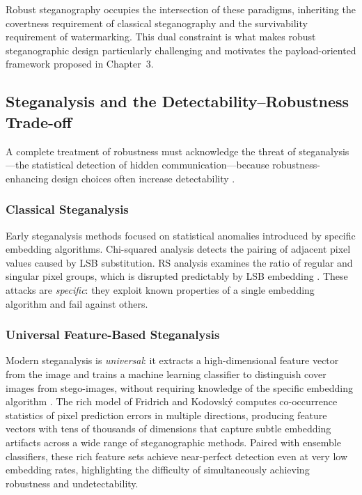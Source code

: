 \documentclass[12pt,a4paper,oneside]{report}
\begin{document}
	Robust steganography occupies the intersection of these paradigms, inheriting the
	covertness requirement of classical steganography and the survivability requirement of
	watermarking.
	This dual constraint is what makes robust steganographic design particularly challenging
	and motivates the payload-oriented framework proposed in Chapter~3.
	
	\subsection{Steganalysis and the Detectability–Robustness Trade-off}
	\label{subsec:steganalysis}
	
	A complete treatment of robustness must acknowledge the threat of steganalysis—the
	statistical detection of hidden communication—because robustness-enhancing design choices
	often increase detectability \cite{Fridrich2012, petitcolas1999information}.
	
	\subsubsection{Classical Steganalysis}
	
	Early steganalysis methods focused on statistical anomalies introduced by specific
	embedding algorithms.
	Chi-squared analysis \cite{provos2003hide} detects the pairing of adjacent pixel values
	caused by LSB substitution.
	RS analysis examines the ratio of regular and singular pixel groups, which is disrupted
	predictably by LSB embedding \cite{provos2003hide}.
	These attacks are \emph{specific}: they exploit known properties of a single embedding
	algorithm and fail against others.
	
	\subsubsection{Universal Feature-Based Steganalysis}
	
	Modern steganalysis is \emph{universal}: it extracts a high-dimensional feature vector
	from the image and trains a machine learning classifier to distinguish cover images from
	stego-images, without requiring knowledge of the specific embedding algorithm
	\cite{Fridrich2012}.
	The rich model of Fridrich and Kodovský \cite{Fridrich2012} computes co-occurrence
	statistics of pixel prediction errors in multiple directions, producing feature vectors
	with tens of thousands of dimensions that capture subtle embedding artifacts across a
	wide range of steganographic methods.
	Paired with ensemble classifiers, these rich feature sets achieve near-perfect detection
	even at very low embedding rates, highlighting the difficulty of simultaneously achieving
	robustness and undetectability.
	
\end{document}
